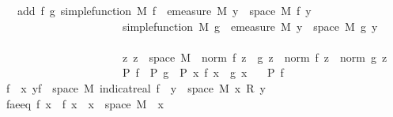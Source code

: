 \begin{isabellebody}
\ \ \ add{\isacharcolon}{\kern0pt}\ {\isachardoublequoteopen}{\isasymAnd}f\ g{\isachardot}{\kern0pt}\ simple{\isacharunderscore}{\kern0pt}function\ M\ f\ {\isasymLongrightarrow}\ emeasure\ M\ {\isacharbraceleft}{\kern0pt}y\ {\isasymin}\ space\ M{\isachardot}{\kern0pt}\ f\ y\ {\isasymnoteq}\ {}{\isacharbraceright}{\kern0pt}\ {\isasymnoteq}\ {\isasyminfinity}\ {\isasymLongrightarrow}\ \isanewline
\ \ \ \ \ \ \ \ \ \ \ \ \ \ \ \ \ \ \ \ \ \ simple{\isacharunderscore}{\kern0pt}function\ M\ g\ {\isasymLongrightarrow}\ emeasure\ M\ {\isacharbraceleft}{\kern0pt}y\ {\isasymin}\ space\ M{\isachardot}{\kern0pt}\ g\ y\ {\isasymnoteq}\ {}{\isacharbraceright}{\kern0pt}\ {\isasymnoteq}\ {\isasyminfinity}\ {\isasymLongrightarrow}\ \isanewline
\ \ \ \ \ \ \ \ \ \ \ \ \ \ \ \ \ \ \ \ \ \ {\isacharparenleft}{\kern0pt}{\isasymAnd}z{\isachardot}{\kern0pt}\ z\ {\isasymin}\ space\ M\ {\isasymLongrightarrow}\ norm\ {\isacharparenleft}{\kern0pt}f\ z\ {\isacharplus}{\kern0pt}\ g\ z{\isacharparenright}{\kern0pt}\ {\isacharequal}{\kern0pt}\ norm\ {\isacharparenleft}{\kern0pt}f\ z{\isacharparenright}{\kern0pt}\ {\isacharplus}{\kern0pt}\ norm\ {\isacharparenleft}{\kern0pt}g\ z{\isacharparenright}{\kern0pt}{\isacharparenright}{\kern0pt}\ {\isasymLongrightarrow}\isanewline
\ \ \ \ \ \ \ \ \ \ \ \ \ \ \ \ \ \ \ \ \ \ P\ f\ {\isasymLongrightarrow}\ P\ g\ {\isasymLongrightarrow}\ P\ {\isacharparenleft}{\kern0pt}{\isasymlambda}x{\isachardot}{\kern0pt}\ f\ x\ {\isacharplus}{\kern0pt}\ g\ x{\isacharparenright}{\kern0pt}{\isachardoublequoteclose}\isanewline
\ \ \ {\isachardoublequoteopen}P\ f{\isachardoublequoteclose}%
\endisatagimportant
{\isafoldimportant}%
%
\isadelimimportant
\isanewline
%
\endisadelimimportant
%
\isadelimproof
%
\endisadelimproof
%
\isatagproof
{}\isamarkupfalse%
{\isacharminus}{\kern0pt}\isanewline
\ \ \isamarkupfalse%
\ {\isacharquery}{\kern0pt}f\ {\isacharequal}{\kern0pt}\ {\isachardoublequoteopen}{\isasymlambda}x{\isachardot}{\kern0pt}\ {\isacharparenleft}{\kern0pt}{\isasymSum}y{\isasymin}f\ {\isacharbackquote}{\kern0pt}\ space\ M{\isachardot}{\kern0pt}\ indicat{\isacharunderscore}{\kern0pt}real\ {\isacharparenleft}{\kern0pt}f\ {\isacharminus}{\kern0pt}{\isacharbackquote}{\kern0pt}\ {\isacharbraceleft}{\kern0pt}y{\isacharbraceright}{\kern0pt}\ {\isasyminter}\ space\ M{\isacharparenright}{\kern0pt}\ x\ {\isacharasterisk}{\kern0pt}\isactrlsub R\ y{\isacharparenright}{\kern0pt}{\isachardoublequoteclose}\isanewline
\ \ \isamarkupfalse%
\ f{\isacharunderscore}{\kern0pt}ae{\isacharunderscore}{\kern0pt}eq{\isacharcolon}{\kern0pt}\ {\isachardoublequoteopen}f\ x\ {\isacharequal}{\kern0pt}\ {\isacharquery}{\kern0pt}f\ x{\isachardoublequoteclose}\ \ {\isachardoublequoteopen}x\ {\isasymin}\ space\ M{\isachardoublequoteclose}\ \ x\ \isamarkupfalse%

\end{isabellebody}

